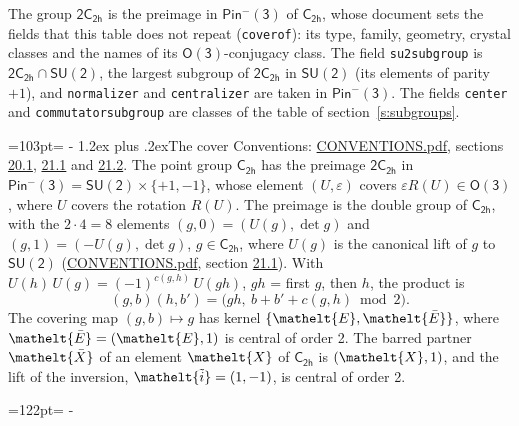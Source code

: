 \documentclass[10pt,a4paper]{article}
\makeatletter
\renewcommand\section{\@startsection{section}{1}{\z@}{-3ex plus -1ex minus -.2ex}%
  {1.2ex plus .2ex}{\normalfont\large\sffamily\bfseries\color{parttitle}}}
\newcommand{\needspace}[1]{\par\penalty-100\begingroup\dimen0=#1\relax\dimen2=\pagegoal
  \advance\dimen2-\pagetotal\ifdim\dimen0>\dimen2\relax\ifdim\dimen2>0pt\vfil\break\fi\fi
  \endgroup}
\numberwithin{equation}{section}
\newcommand{\eltfont}[1]{{\let\sigma\eltsigma\mathelt{#1}}}
\newcommand{\grp}[1]{\mathsf{#1}}
\newcommand{\elt}[1]{\eltfont{#1}}
\newcommand{\dirprod}{\times}
\newcommand{\barred}[1]{\bar{#1}}
\newcommand{\lift}[1]{\tilde{#1}}
\makeatother
\begin{document}
\leavevmode\label{n:element.inversion}\label{n:group.preimage}The group $\grp{2C_{2h}}$ is the preimage in $\grp{Pin^{-}(3)}$ of \href{../../../rotation/data/pdf/C2h.pdf}{$\grp{C_{2h}}$}, whose document sets the fields that this table does not repeat (\texttt{coverof}): its type, family, geometry, crystal classes and the names of its \href{../../../rotation/data/pdf/O3.pdf}{$\grp{O(3)}$}-conjugacy class. The field \texttt{su2subgroup} is $\grp{2C_{2h}} \cap \grp{SU(2)}$, the largest subgroup of $\grp{2C_{2h}}$ in $\grp{SU(2)}$ (its elements of parity $+1$), and \texttt{normalizer} and \texttt{centralizer} are taken in $\grp{Pin^{-}(3)}$. The fields \texttt{center} and \texttt{commutatorsubgroup} are classes of the table of section~\ref{s:subgroups}.
\needspace{103pt}
\section{The cover}\label{s:cover}
Conventions: \href{../../CONVENTIONS.pdf}{CONVENTIONS.pdf}, sections \href{../../CONVENTIONS.pdf\#conv.20.1}{20.1}, \href{../../CONVENTIONS.pdf\#conv.21.1}{21.1} and \href{../../CONVENTIONS.pdf\#conv.21.2}{21.2}.
\leavevmode\label{n:group.pin.minus}\label{n:group.su2}\label{n:local.pin.sign}\label{n:matrix.covered}\label{n:matrix.lift.su2}\label{n:index.bar}The point group $\grp{C_{2h}}$ has the preimage $\grp{2C_{2h}}$ in $\grp{Pin^{-}(3)} = \grp{SU(2)} \dirprod \{+1, -1\}$, whose element $(U, \varepsilon)$ covers $\varepsilon R(U) \in \grp{O(3)}$, where $U$ covers the rotation $R(U)$. The preimage is the double group of $\grp{C_{2h}}$, with the $2 \cdot 4 = 8$ elements $(g, 0) = (U(g), \det g)$ and $(g, 1) = (-U(g), \det g)$, $g \in \grp{C_{2h}}$, where $U(g)$ is the canonical lift of $g$ to $\grp{SU(2)}$ (\href{../../CONVENTIONS.pdf}{CONVENTIONS.pdf}, section \href{../../CONVENTIONS.pdf\#conv.21.1}{21.1}). \label{n:function.cocycle}With $U(h)\,U(g) = (-1)^{c(g,h)}\,U(gh)$, $gh$ = first $g$, then $h$, the product is
\begin{equation}\label{e:product}(g, b)(h, b') = \bigl(gh,\ b + b' + c(g, h) \bmod 2\bigr).\end{equation}
\leavevmode\label{n:mark.bar}The covering map $(g, b) \mapsto g$ has kernel $\{\elt{E}, \elt{\barred{E}}\}$, where $\elt{\barred{E}} = (\elt{E}, 1)$ is central of order 2. \label{n:element.named}\label{n:mark.lift}The barred partner $\elt{\barred{X}}$ of an element $\elt{X}$ of $\grp{C_{2h}}$ is $(\elt{X}, 1)$, and the lift of the inversion, $\elt{\lift{i}} = (1, -1)$, is central of order 2.
\needspace{122pt}
\end{document}
